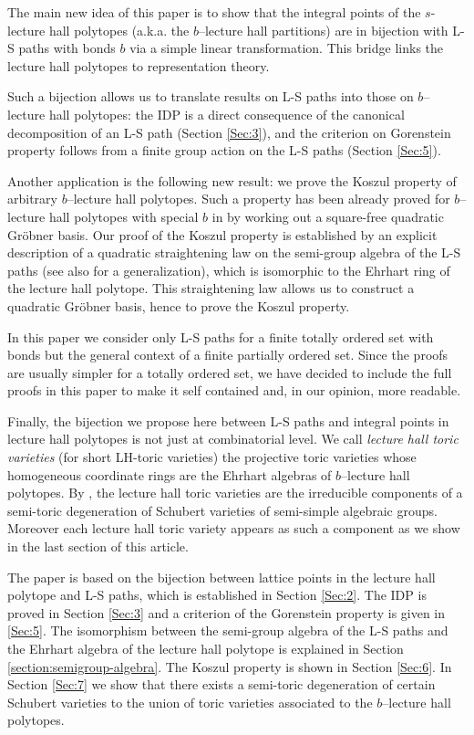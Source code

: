 \documentclass[12pt, a4paper]{amsart}   	%
\numberwithin{equation}{section}
\theoremstyle{plain}
\theoremstyle{definition}
\begin{document}
The main new idea of this paper is to show that the integral points of the $s$-lecture hall polytopes (a.k.a. the $b$--lecture hall partitions) are in bijection with L-S paths with bonds $b$ via a simple linear transformation. This bridge links the lecture hall polytopes to representation theory.

Such a bijection allows us to translate results on L-S paths \cite{Chirivi} into those on $b$--lecture hall polytopes: the IDP is a direct consequence of the canonical decomposition of an L-S path (Section \ref{Sec:3}), and the criterion on Gorenstein property follows from a finite group action on the L-S paths (Section \ref{Sec:5}).

Another application is the following new result: we prove the Koszul property of arbitrary $b$--lecture hall polytopes. Such a property has been already proved for $b$--lecture hall polytopes with special $b$ in \cite{BrandenSolus} by working out a square-free quadratic Gr\"obner basis. Our proof of the Koszul property is established by an explicit description of a quadratic straightening law on the semi-group algebra of the L-S paths \cite{LLM, Chirivi} (see also \cite{CFL3} for a generalization), which is isomorphic to the Ehrhart ring of the lecture hall polytope. This straightening law allows us to construct a quadratic Gr\"obner basis, hence to prove the Koszul property.

\smallskip

In this paper we consider only L-S paths for a finite totally ordered set with bonds but the general context of a finite partially ordered set. Since the proofs are usually simpler for a totally ordered set, we have decided to include the full proofs in this paper to make it self contained and, in our opinion, more readable.

Finally, the bijection we propose here between L-S paths and integral points in lecture hall polytopes is not just at combinatorial level. We call \emph{lecture hall toric varieties} (for short LH-toric varieties) the projective toric varieties whose homogeneous coordinate rings are the Ehrhart algebras of $b$--lecture hall polytopes. By \cite{Chirivi}, the lecture hall toric varieties are the irreducible components of a semi-toric degeneration of Schubert varieties of semi-simple algebraic groups. Moreover each lecture hall toric variety appears as such a component as we show in the last section of this article.

\smallskip

 The paper is based on the bijection between lattice points in the lecture hall polytope and L-S paths, which is established in Section \ref{Sec:2}. The IDP is proved in Section \ref{Sec:3} and a criterion of the Gorenstein property is given in \ref{Sec:5}. The isomorphism between the semi-group algebra of the L-S paths and the Ehrhart algebra of the lecture hall polytope is explained in Section \ref{section:semigroup-algebra}. The Koszul property is shown in Section \ref{Sec:6}. In Section \ref{Sec:7} we show that there exists a semi-toric degeneration of certain Schubert varieties to the union of toric varieties associated to the $b$--lecture hall polytopes.
\end{document}
